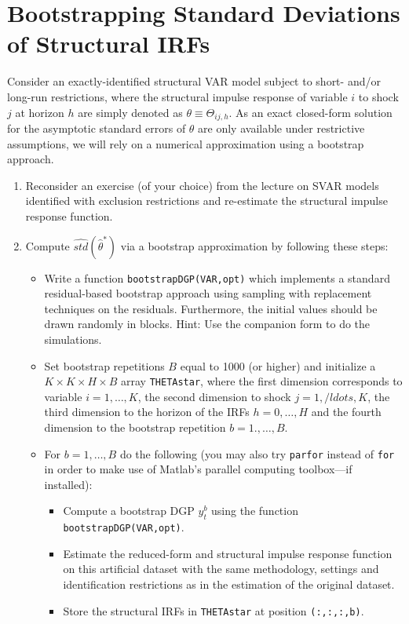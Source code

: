 \section[Bootstrapping Standard Deviations of Structural IRFs]{Bootstrapping Standard Deviations of Structural IRFs\label{ex:BootstrapStandardDeviationStructuralIRFs}}
Consider an exactly-identified structural VAR model subject to short- and/or long-run restrictions,
  where the structural impulse response of variable \(i\) to shock \(j\) at horizon \(h\) are simply denoted as \(\theta \equiv \Theta_{ij,h}\).
As an exact closed-form solution for the asymptotic standard errors of \(\theta \) are only available under restrictive assumptions,
  we will rely on a numerical approximation using a bootstrap approach.

\begin{enumerate}

\item Reconsider an exercise (of your choice) from the lecture on SVAR models identified with exclusion restrictions
and re-estimate the structural impulse response function.

\item Compute \(\widehat{std}(\hat{\theta}^{\ast})\) via a bootstrap approximation by following these steps:

\begin{itemize}

\item Write a function \texttt{bootstrapDGP(VAR,opt)} which implements a standard residual-based bootstrap approach
  using sampling with replacement techniques on the residuals.
Furthermore, the initial values should be drawn randomly in blocks.
Hint: Use the companion form to do the simulations.

\item Set bootstrap repetitions \(B\) equal to 1000 (or higher)
  and initialize a \(K \times K \times H \times B\) array \texttt{THETAstar},
  where the first dimension corresponds to variable \(i=1,\ldots,K\),
  the second dimension to shock \(j=1,/ldots,K\),
  the third dimension to the horizon of the IRFs \(h=0,\ldots,H\)
  and the fourth dimension to the bootstrap repetition \(b=1.,\ldots,B\).

\item For \(b=1,\ldots,B\) do the following (you may also try \texttt{parfor} instead of \texttt{for}
  in order to make use of Matlab's parallel computing toolbox---if installed):
  \begin{itemize}
  \item Compute a bootstrap DGP \(y_t^{b}\) using the function \texttt{bootstrapDGP(VAR,opt)}.
  \item Estimate the reduced-form and structural impulse response function on this artificial dataset
    with the same methodology, settings and identification restrictions as in the estimation of the original dataset.
  \item Store the structural IRFs in \texttt{THETAstar} at position \texttt{(:,:,:,b)}.
  \end{itemize}


\end{itemize}
\end{enumerate}
